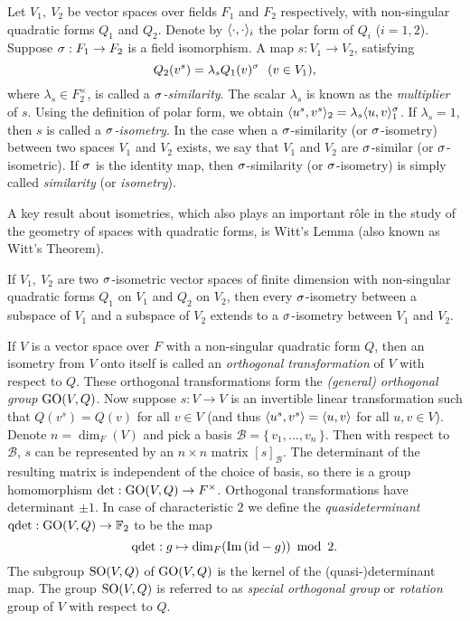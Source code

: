Let $V_1,\ V_2$ be vector spaces over fields $F_1$ and $F_2$ respectively, with non-singular
quadratic forms $Q_1$ and $Q_2$. Denote by $\langle \cdot, \cdot \rangle_i$ the polar form of 
$Q_i$ ($i = 1,2$). Suppose $\sigma : F_1 \rightarrow F_2$ is a field isomorphism. A map
$s : V_1 \rightarrow V_2$, satisfying
\begin{equation}
	\label{eq:similarity}
	Q_2( v^s ) = \lambda_s Q_1(v)^{\sigma}\ \ (v \in V_1),
\end{equation}
where $\lambda_s \in F_2^{\times}$, is called a \textit{$\sigma$-similarity}. The scalar
$\lambda_s$ is known as the \textit{multiplier} of $s$. Using the definition of polar form, 
we obtain $\langle u^s, v^s \rangle_2 = \lambda_s \langle u, v \rangle_1^{\sigma}$. 
If $\lambda_s = 1$, then
$s$ is called a \textit{$\sigma$-isometry}. In the case
when a $\sigma$-similarity (or $\sigma$-isometry) between two spaces $V_1$ and $V_2$ exists, 
we say that $V_1$ and $V_2$ are $\sigma$-similar (or $\sigma$-isometric). 
If $\sigma$ is the identity map, then $\sigma$-similarity (or $\sigma$-isometry) is simply called 
 \textit{similarity} (or \textit{isometry}).

A key result about isometries, which also plays an important r\^{o}le in the study of the geometry
of spaces with quadratic forms, is Witt's Lemma (also known as Witt's Theorem). 

\begin{theorem}
	If $V_1,\ V_2$ are two $\sigma$-isometric 
	vector spaces of finite dimension with non-singular
	quadratic forms $Q_1$ on $V_1$ and $Q_2$ on $V_2$, then every $\sigma$-isometry between a 
	subspace of $V_1$ and a subspace of $V_2$ extends to a \mbox{$\sigma$-isometry}
	between $V_1$ and $V_2$. 
\end{theorem}

If $V$ is a vector space over $F$ 
with a non-singular quadratic form $Q$, then an isometry from $V$ onto
itself is called an \textit{orthogonal transformation} of $V$ with respect to $Q$. These 
orthogonal transformations form the \textit{(general) orthogonal group} $\mathrm{GO}(V,Q)$. Now suppose 
$s : V \rightarrow V$ is an invertible linear transformation such that $Q(v^s) = Q(v)$ for
all $v \in V$ (and thus $\langle u^s, v^s \rangle = \langle u, v \rangle$ for all $u,v \in V$).
Denote $n = \dim_F(V)$ and pick a basis $\mathcal{B} = \{\,v_1,...,v_n\,\}$. 
Then with respect to $\mathcal{B}$, $s$ can be represented by an $n\times n$ matrix
$[s]_{\mathcal{B}}$. The determinant of the resulting matrix is independent of 
the choice of basis, so there is a group homomorphism 
$\det: \mathrm{GO}(V,Q) \rightarrow F^{\times}$. Orthogonal transformations have determinant $\pm 1$.
In case of characteristic $2$ we define the \textit{quasideterminant}
$\mathrm{qdet}:\mathrm{GO}(V,Q) \rightarrow \mathbb{F}_2$ to be the map
\begin{equation}
	\label{eq:qdet}
    \mathrm{qdet}: g \mapsto \dim_F ( \im(\mathrm{id} - g) )\ \operatorname{mod}\ 2.
\end{equation}
The subgroup $\mathrm{SO}(V,Q)$ of $\mathrm{GO}(V,Q)$ is the kernel of the (quasi-)determinant map. The group
$\mathrm{SO}(V,Q)$ is referred to as \textit{special orthogonal group} or \textit{rotation} group
of $V$ with respect to $Q$. 

